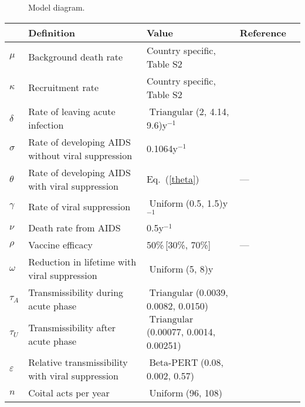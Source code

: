 \documentclass{article}
\DeclareMathOperator{\Uniform}{Uniform}
\DeclareMathOperator{\Triangular}{Triangular}
\DeclareMathOperator{\BetaPERT}{Beta-PERT}
\begin{document}
\begin{figure}
  \centering
  
  \caption{Model diagram.}
  \label{model_diag}
\end{figure}

\begin{table}
  \begin{center}
    \begin{tabularx}{\textwidth}{lXlll}
      \hline
      & Definition & Value & Reference \\
      \hline
      $\mu$ & Background death rate & Country specific, Table S2
      & \cite{World_Development_Indicators2013-ee} \\
      $\kappa$ & Recruitment rate & Country specific, Table S2
      & \cite{World_Development_Indicators2013-ee, WorldBankpg} \\
      $\delta$	& Rate of leaving acute infection
      & $\Triangular$(2, 4.14, 9.6)\;y$^{-1}$
      & \cite{Hollingsworth2008-iy} \\
      $\sigma$	& Rate of developing AIDS without viral suppression
      & 0.1064\;y$^{-1}$ & \cite{Morgan2002-cq} \\
      $\theta$ & Rate of developing AIDS with viral suppression
      & Eq.~(\ref{theta}) & --- \\
      $\gamma$ & Rate of viral suppression
      & $\Uniform$(0.5, 1.5)\;y$^{-1}$
      & \cite{Currie2009-yz} \\
      $\nu$ & Death rate from AIDS & 0.5\;y$^{-1}$
      & \cite{Morgan2002-cq} \\
      $\rho$ & Vaccine efficacy & 50\%\,[30\%, 70\%] & --- \\
      $\omega$	& Reduction in lifetime with viral suppression
      & $\Uniform$(5, 8)\;y
      & \cite{Samji2013-kf, Unaids2014-ue} \\
      $\tau_{A}$ & Transmissibility during acute phase
      & $\Triangular$(0.0039, 0.0082, 0.0150)
      & \cite{Wawer2005-us, Skarbinski2015-ni}\\
      $\tau_{U}$ & Transmissibility after acute phase
      & $\Triangular$(0.00077, 0.0014, 0.00251)
      & \cite{Hughes2012-so} \\
      $\varepsilon$ & Relative transmissibility with
      viral suppression & $\BetaPERT$(0.08, 0.002, 0.57)
      & \cite{Donnell2010-xo, attia_2009, wilson_2012, jia_2013,
        rodger_2016} \\
      $n$ & Coital acts per year & $\Uniform$(96, 108)
      & \cite{Wawer2005-us, Abdool_Karim2010-cm}\\

\end{tabularx}
\end{center}
\end{table}
\end{document}
